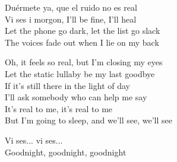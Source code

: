 \begin{lyrics}
Duérmete ya, que el ruido no es real\\
Vi ses i morgon, I’ll be fine, I’ll heal\\
Let the phone go dark, let the list go slack\\
The voices fade out when I lie on my back

Oh, it feels so real, but I’m closing my eyes\\
Let the static lullaby be my last goodbye\\
If it’s still there in the light of day\\
I’ll ask somebody who can help me say\\
It’s real to me, it’s real to me\\
But I’m going to sleep, and we’ll see, we’ll see

Vi ses... vi ses...\\
Goodnight, goodnight, goodnight
\end{lyrics}

